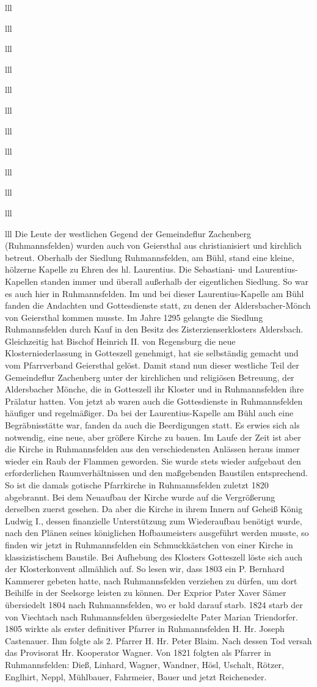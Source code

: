 \documentclass[12pt,a4pager]{book}
\begin{document}
\begin{tabuluar}{lll}
\begin{tabuluar}{lll}
\begin{tabuluar}{lll}
\begin{tabuluar}{lll}
\begin{tabuluar}{lll}
\begin{tabuluar}{lll}
\begin{tabuluar}{lll}
\begin{tabuluar}{lll}
\begin{tabuluar}{lll}
\begin{tabuluar}{lll}
\begin{tabuluar}{lll}
\begin{tabuluar}{lll}
Die Leute der westlichen Gegend der Gemeindeflur Zachenberg (Ruhmannsfelden)
wurden auch von Geiersthal aus christianisiert und kirchlich betreut. Oberhalb
der Siedlung Ruhmannsfelden, am Bühl, stand eine kleine, hölzerne Kapelle zu
Ehren des hl. Laurentius. Die Sebastiani- und Laurentius-Kapellen standen immer
und überall außerhalb der eigentlichen Siedlung. So war es auch hier in
Ruhmannsfelden. Im und bei dieser Laurentius-Kapelle am Bühl fanden die
Andachten und Gottesdienste statt, zu denen der Aldersbacher-Mönch von
Geiersthal kommen musste. Im Jahre 1295 gelangte die Siedlung Ruhmannsfelden
durch Kauf in den Besitz des Zisterzienserklosters Aldersbach. Gleichzeitig hat
Bischof Heinrich II. von Regensburg die neue Klosterniederlassung in Gotteszell
genehmigt, hat sie selbständig gemacht und vom Pfarrverband Geiersthal gelöst.
Damit stand nun dieser westliche Teil der Gemeindeflur Zachenberg unter der
kirchlichen und religiösen Betreuung, der Aldersbacher Mönche, die in Gotteszell
ihr Kloster und in Ruhmannsfelden ihre Prälatur hatten. Von jetzt ab waren auch
die Gottesdienste in Ruhmannsfelden häufiger und regelmäßiger. Da bei der
Laurentius-Kapelle am Bühl auch eine Begräbnisstätte war, fanden da auch die
Beerdigungen statt. Es erwies sich als notwendig, eine neue, aber größere Kirche
zu bauen. Im Laufe der Zeit ist aber die Kirche in Ruhmannsfelden aus den
verschiedensten Anlässen heraus immer wieder ein Raub der Flammen geworden. Sie
wurde stets wieder aufgebaut den erforderlichen Raumverhältnissen und den
maßgebenden Baustilen entsprechend. So ist die damals gotische Pfarrkirche in
Ruhmannsfelden zuletzt 1820 abgebrannt. Bei dem Neuaufbau der Kirche wurde auf
die Vergrößerung derselben zuerst gesehen. Da aber die Kirche in ihrem Innern
auf Geheiß König Ludwig I., dessen finanzielle Unterstützung zum Wiederaufbau
benötigt wurde, nach den Plänen seines königlichen Hofbaumeisters ausgeführt
werden musste, so finden wir jetzt in Ruhmannsfelden ein Schmuckkästchen von
einer Kirche in klassizistischem Baustile. Bei Aufhebung des Klosters Gotteszell
löste sich auch der Klosterkonvent allmählich auf. So lesen wir, dass 1803 ein
P. Bernhard Kammerer gebeten hatte, nach Ruhmannsfelden verziehen zu dürfen, um
dort Beihilfe in der Seelsorge leisten zu können. Der Exprior Pater Xaver Sämer
übersiedelt 1804 nach Ruhmannsfelden, wo er bald darauf starb. 1824 starb der
von Viechtach nach Ruhmannsfelden übergesiedelte Pater Marian Triendorfer. 1805
wirkte als erster definitiver Pfarrer in Ruhmannsfelden H. Hr. Joseph
Castenauer. Ihm folgte als 2. Pfarrer H. Hr. Peter Blaim. Nach dessen Tod versah
das Provisorat Hr. Kooperator Wagner. Von 1821 folgten als Pfarrer in
Ruhmannsfelden: Dieß, Linhard, Wagner, Wandner, Hösl, Uschalt, Rötzer, Englhirt,
Neppl, Mühlbauer, Fahrmeier, Bauer und jetzt Reicheneder.


\end{tabuluar}
\end{tabuluar}
\end{tabuluar}
\end{tabuluar}
\end{tabuluar}
\end{tabuluar}
\end{tabuluar}
\end{tabuluar}
\end{tabuluar}
\end{tabuluar}
\end{tabuluar}
\end{tabuluar}
\end{document}
